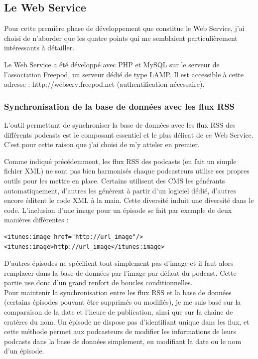 \documentclass[11pt, french]{report}
\begin{document}
\subsection{Le Web Service}

Pour cette première phase de développement que constitue le Web Service, j'ai choisi de n'aborder que les quatre points qui me semblaient particulièrement intéressants à détailler.

Le Web Service a été développé avec PHP et MySQL sur le serveur de l'association Freepod, un serveur dédié de type LAMP. Il est accessible à cette adresse : http://webserv.freepod.net (authentification nécessaire).

\subsubsection{Synchronisation de la base de données avec les flux RSS}

L'outil permettant de synchroniser la base de données avec les flux RSS des différents podcasts est le composant essentiel et le plus délicat de ce Web Service. C'est pour cette raison que j'ai choisi de m'y atteler en premier.\\


Comme indiqué précédemment, les flux RSS des podcasts (en fait un simple fichier XML) ne sont pas bien harmonisés chaque podcasteurs utilise ses propres outils pour les mettre en place. Certains utilisent des CMS les générants automatiquement, d'autres les génèrent à partir d'un logiciel dédié, d'autres encore éditent le code XML à la main. Cette diversité induit une diversité dans le code. L'inclusion d'une image pour un épisode se fait par exemple de deux manières différentes :
\begin{lstlisting}
<itunes:image href="http://url_image"/>
<itunes:image>http://url_image</itunes:image>
\end{lstlisting}
D'autres épisodes ne spécifient tout simplement pas d'image et il faut alors remplacer dans la base de données par l'image par défaut du podcast. Cette partie use donc d'un grand renfort de boucles conditionnelles.\\

Pour maintenir la synchronisation entre les flux RSS et la base de données (certains épisodes pouvant être supprimés ou modifiés), je me suis basé sur la comparaison de la date et l'heure de publication, ainsi que sur la chaine de cratères du nom. Un épisode ne dispose pas d'identifiant unique dans les flux, et cette méthode permet aux podcasteurs de modifier les informations de leurs podcasts dans la base de données simplement, en modifiant la date ou le nom d'un épisode.
\end{document}
